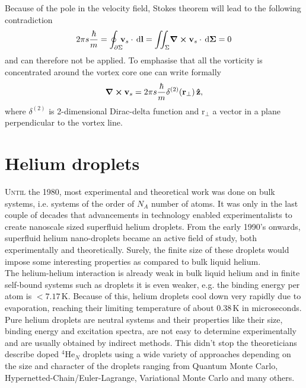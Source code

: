 \documentclass[12pt,a4paper,twosides]{book}
\renewcommand{\vec}[1]{\bm{\mathrm{#1}}}
\newcommand{\unit}[1]{\,\mathrm{#1}}
\begin{document}
			Because of the pole in the velocity field, Stokes theorem will lead to the following contradiction
			\begin{align}
				2\pi s\frac{\hbar}{m}=\oint_{\partial\Sigma}\!\!\!\vec{v}_s\cdot\unit{d}\vec{l} = \iint_{\Sigma}\!\curl{\vec{v}_s}\cdot\unit{d}\vec{\Sigma} = 0
			\end{align}
			and can therefore not be applied. To emphasise that all the vorticity is concentrated around the vortex core one can write formally
			\begin{align}
				\curl{\vec{v}_s} = 2\pi s\frac{\hbar}{m}\delta^{(2)}(\vec{r}_\perp)\,\vu{z},
			\end{align}
			where $\delta^{(2)}$ is 2-dimensional Dirac-delta function and $\vec{r}_\perp$ a vector in a plane perpendicular to the vortex line.\\

	\clearpage
	\section{Helium droplets}
		\lettrine[lines=3,findent=3pt,nindent=0pt]{U}{ntil} the 1980, most experimental and theoretical work was done on bulk systems, i.e. systems of the order of $N_A$ number of atoms. It was only in the last couple of decades that advancements in technology enabled experimentalists to create nanoscale sized superfluid helium droplets. From the early 1990's onwards, superfluid helium nano-droplets became an active field of study, both experimentally and theoretically. Surely, the finite size of these droplets would impose some interesting properties as compared to bulk liquid helium.\\
		
		The helium-helium interaction is already weak in bulk liquid helium and in finite self-bound systems such as droplets it is even weaker, e.g. the binding energy per atom is $<\!7.17\unit{K}$. Because of this, helium droplets cool down very rapidly due to evaporation, reaching their limiting temperature of about $0.38\unit{K}$ in microseconds. Pure helium droplets are neutral systems and their properties like their size, binding energy and excitation spectra, are not easy to determine experimentally and are usually obtained by indirect methods. This didn't stop the theoreticians describe doped $^4$He$_N$ droplets using a wide variety of approaches depending on the size and character of the droplets ranging from Quantum Monte Carlo, Hypernetted-Chain/Euler-Lagrange, Variational Monte Carlo and many others.\\
	
\end{document}
